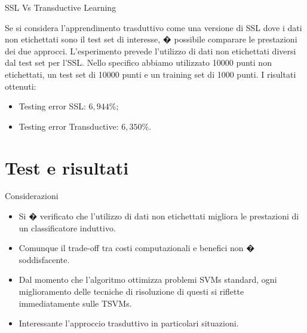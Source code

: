 \documentclass[mathserif]{beamer}
\begin{document}
\begin{frame}{SSL Vs Transductive Learning}
\begin{block}{}
Se si considera l'apprendimento trasduttivo come una versione di SSL dove i dati non etichettati sono il test set di interesse, � possibile comparare le prestazioni dei due approcci. L'esperimento prevede l'utilizzo di dati non etichettati diversi dal test set per l'SSL. Nello specifico abbiamo utilizzato 10000 punti non etichettati, un test set di 10000 punti e un training set di 1000 punti. I risultati ottenuti:
\begin{itemize}
	\item<1-> Testing error SSL: \alert{$6,944 \%$};
	\item<1-> Testing error Transductive: \alert{$6,350 \%$}.
\end{itemize}
\end{block}
\end{frame}

\section{Test e risultati}


\begin{frame}{Considerazioni}
\begin{block}{}
\begin{itemize}
	\item<1-> Si � verificato che l'utilizzo di dati non etichettati migliora le prestazioni di un classificatore induttivo.
	\item<1-> Comunque il trade-off tra costi computazionali e benefici non � soddisfacente.
	\item<1-> Dal momento che l'algoritmo ottimizza problemi SVMs standard, ogni miglioramento delle tecniche di risoluzione di questi si riflette immediatamente sulle TSVMs.  
	\item<1-> Interessante l'approccio trasduttivo in particolari situazioni.
\end{itemize}
\end{block}
\end{frame}
\end{document}
